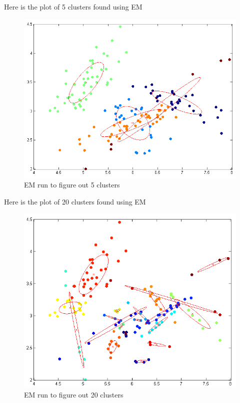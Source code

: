 \documentclass[twoside,11pt]{article}
\theoremstyle{definition}
\begin{document}
Here is the plot of 5 clusters found using EM
\begin{figure}[h]
\centering
\includegraphics[width=6 in]{prob1PartD_1.png}
\caption{EM run to figure out 5 clusters}
\end{figure}
\newpage
Here is the plot of 20 clusters found using EM
\begin{figure}[h]
\centering
\includegraphics[width=6 in]{prob1PartD_2.png}
\caption{EM run to figure out 20 clusters}
\end{figure}

\newpage
\end{document}
